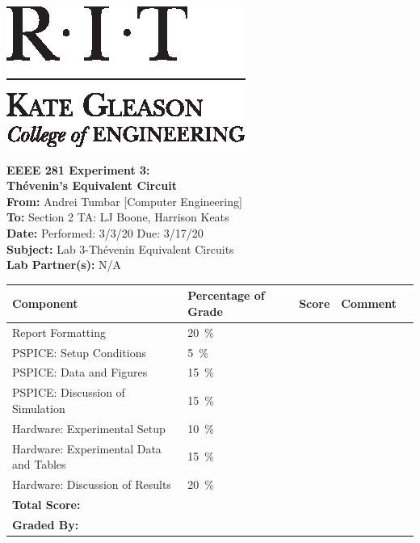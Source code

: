 \documentclass[11pt]{article}
\begin{document}
	\hspace{6in}
		\includegraphics[scale=0.9,trim=0cm 0in 0in 0.0in,clip]{RIT_KGCOE1}
\newline

\Huge \textbf{EEEE 281 Experiment 3:\\ Th\'evenin's Equivalent Circuit}\\

\Large
\textbf{From:} Andrei Tumbar [Computer Engineering] \\
\textbf{To: } Section 2 TA: LJ Boone, Harrison Keats \\
\textbf{Date: } Performed: 3/3/20  Due: 3/17/20 \\
\textbf{Subject: } Lab 3-Th\'evenin Equivalent Circuits\\
\textbf{Lab Partner(s): } N/A\\
\vspace{0.5in}
	\begin{table}[h!]
		\centering
		\begin{tabular}{|l||l|l|l|l|}
			\hline
			Component & Percentage of Grade   & Score \hspace{0.5in} & Comment \hspace{1in}  \\
			\hline
			Report Formatting & 20~\si{\percent} & & \\	 
			\hline
			\hline 
			PSPICE: Setup Conditions & 5~\si{\percent} & & \\	 
			 \hline
			PSPICE: Data and Figures & 15~\si{\percent} & & \\	 
			 \hline
			PSPICE: Discussion of Simulation & 15~\si{\percent} & & \\	 
			\hline
			\hline
			Hardware: Experimental Setup & 10~\si{\percent} & & \\	 
			\hline
			Hardware: Experimental Data and Tables & 15~\si{\percent} & & \\	 
			\hline
			Hardware: Discussion of Results & 20~\si{\percent} & & \\	 
			\hline
			\hline
			\textbf{Total Score:}&  & & \\	 
			\hline
			\textbf{Graded By:}&  & & \\	 
			\hline
		\end{tabular}
	\end{table}
\newpage
\end{document}
